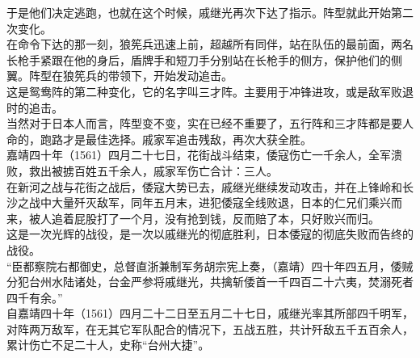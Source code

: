 \begin{multicols}{\theparacolNo}
于是他们决定逃跑，也就在这个时候，戚继光再次下达了指示。阵型就此开始第二次变化。\\

在命令下达的那一刻，狼筅兵迅速上前，超越所有同伴，站在队伍的最前面，两名长枪手紧跟在他的身后，盾牌手和短刀手分别站在长枪手的侧方，保护他们的侧翼。阵型在狼筅兵的带领下，开始发动追击。\\

这是鸳鸯阵的第二种变化，它的名字叫三才阵。主要用于冲锋进攻，或是敌军败退时的追击。\\

当然对于日本人而言，阵型变不变，实在已经不重要了，五行阵和三才阵都是要人命的，跑路才是最佳选择。戚家军追击残敌，再次大获全胜。\\

嘉靖四十年（1561）四月二十七日，花街战斗结束，倭寇伤亡一千余人，全军溃败，救出被掳百姓五千余人，戚家军伤亡合计：三人。\\

在新河之战与花街之战后，倭寇大势已去，戚继光继续发动攻击，并在上锋岭和长沙之战中大量歼灭敌军，同年五月末，进犯倭寇全线败退，日本的仁兄们乘兴而来，被人追着屁股打了一个月，没有抢到钱，反而赔了本，只好败兴而归。\\

这是一次光辉的战役，是一次以戚继光的彻底胜利，日本倭寇的彻底失败而告终的战役。\\

“臣都察院右都御史，总督直浙兼制军务胡宗宪上奏，（嘉靖）四十年四五月，倭贼分犯台州水陆诸处，台金严参将戚继光，共擒斩倭首一千四百二十六夷，焚溺死者四千有余。”\\

自嘉靖四十年（1561）四月二十二日至五月二十七日，戚继光率其所部四千明军，对阵两万敌军，在无其它军队配合的情况下，五战五胜，共计歼敌五千五百余人，累计伤亡不足二十人，史称“台州大捷”。\\
\ifnum{}
	\end{multicols}
\fi
\newpage
